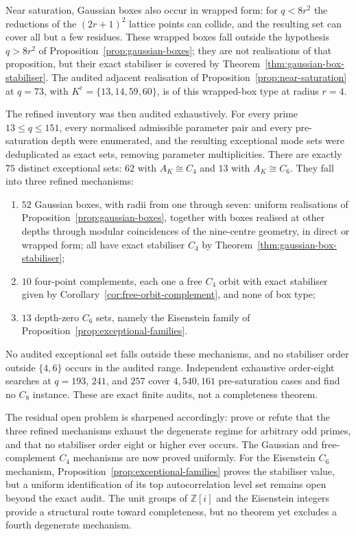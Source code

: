 \documentclass[11pt,a4paper]{article}
\theoremstyle{definition}
\theoremstyle{remark}
\begin{document}
Near saturation, Gaussian boxes also occur in wrapped form: for $q<8r^2$ the reductions of
the $(2r+1)^2$ lattice points can collide, and the resulting set can cover all but a few
residues.
These wrapped boxes fall outside the hypothesis $q>8r^2$ of
Proposition~\ref{prop:gaussian-boxes}; they are not realisations of that proposition, but
their exact stabiliser is covered by Theorem~\ref{thm:gaussian-box-stabiliser}.
The audited adjacent realisation of Proposition~\ref{prop:near-saturation} at $q=73$,
with $K^{\mathrm{c}}=\{13,14,59,60\}$, is of this wrapped-box type at radius $r=4$.

The refined inventory was then audited exhaustively.
For every prime $13\leq q\leq151$, every normalised admissible parameter pair and every
pre-saturation depth were enumerated, and the resulting exceptional mode sets were
deduplicated as exact sets, removing parameter multiplicities.
There are exactly $75$ distinct exceptional sets: $62$ with $A_K\cong C_4$ and $13$ with
$A_K\cong C_6$.
They fall into three refined mechanisms:

\begin{enumerate}[label=(\alph*)]
  \item $52$ Gaussian boxes, with radii from one through seven: uniform realisations of
  Proposition~\ref{prop:gaussian-boxes}, together with boxes realised at other depths
  through modular coincidences of the nine-centre geometry, in direct or wrapped form;
  all have exact stabiliser $C_4$ by
  Theorem~\ref{thm:gaussian-box-stabiliser};
  \item $10$ four-point complements, each one a free $C_4$ orbit with exact stabiliser
  given by Corollary~\ref{cor:free-orbit-complement}, and none of box type;
  \item $13$ depth-zero $C_6$ sets, namely the Eisenstein family of
  Proposition~\ref{prop:exceptional-families}.
\end{enumerate}

No audited exceptional set falls outside these mechanisms, and no stabiliser order outside
$\{4,6\}$ occurs in the audited range.
Independent exhaustive order-eight searches at $q=193$, $241$, and $257$ cover
$4{,}540{,}161$ pre-saturation cases and find no $C_8$ instance.
These are exact finite audits, not a completeness theorem.

The residual open problem is sharpened accordingly: prove or refute that the three refined
mechanisms exhaust the degenerate regime for arbitrary odd primes, and that no stabiliser
order eight or higher ever occurs.
The Gaussian and free-complement $C_4$ mechanisms are now proved uniformly.
For the Eisenstein $C_6$ mechanism, Proposition~\ref{prop:exceptional-families} proves the
stabiliser value, but a uniform identification of its top autocorrelation level set remains
open beyond the exact audit.
The unit groups of $\mathbb{Z}[i]$ and the Eisenstein integers provide a structural route
toward completeness, but no theorem yet excludes a fourth degenerate mechanism.
\end{document}
